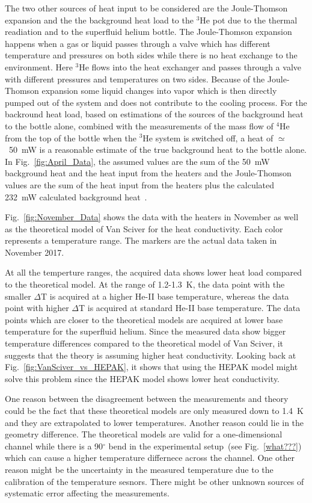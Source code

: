 The two other sources of heat input to be considered are the
Joule-Thomson expansion and the the background heat load to the $^3$He
pot due to the thermal readiation and to the superfluid helium
bottle. The Joule-Thomson expansion happens when a gas or liquid
passes through a valve which has different temperature and pressures
on both sides while there is no heat exchange to the environment. Here
$^3$He flows into the heat exchanger and passes through a valve with
different pressures and temperatures on two sides. Because of the
Joule-Thomson expansion some liquid changes into vapor which is then
directly pumped out of the system and does not contribute to the
cooling process. For the backround heat load, based on estimations of
the sources of the background heat to the bottle alone, combined with
the measurements of the mass flow of $^4$He from the top of the bottle
when the $^3$He system is switched off, a heat of $\simeq$~50~mW is a
reasonable estimate of the true background heat to the bottle
alone. In Fig.~\ref{fig:April_Data}, the assumed values are the sum of
the 50~mW background heat and the heat input from the heaters and the
Joule-Thomson values are the sum of the heat input from the heaters
plus the calculated 232~mW calculated background
heat~\cite{Florian_thesis}.



Fig.~\ref{fig:November_Data} shows the data with the heaters in
November as well as the theoretical model of Van Sciver for the heat
conductivity. Each color represents a temperature range. The markers
are the actual data taken in November 2017.

At all the temperture ranges, the acquired data shows lower heat load
compared to the theoretical model. At the range of 1.2-1.3~K, the data
point with the smaller $\Delta$T is acquired at a higher He-II base
temperature, whereas the data point with higher $\Delta$T is acquired
at standard He-II base temperature. The data points which are closer
to the theoretical models are acquired at lower base temperature for
the superfluid helium. Since the measured data show bigger temperature
differences compared to the theoretical model of Van Sciver, it
suggests that the theory is assuming higher heat conductivity. Looking
back at Fig.~\ref{fig:VanSciver_vs_HEPAK}, it shows that using the
HEPAK model might solve this problem since the HEPAK model shows lower
heat conductivity.

One reason between the disagreement between the measurements and
theory could be the fact that these theoretical models are only
measured down to 1.4~K and they are extrapolated to lower
temperatures. Another reason could lie in the geometry difference. The
theoretical models are valid for a one-dimensional channel while there
is a 90$^\circ$ bend in the experimental setup~(see
Fig.~\ref{what???}) which can cause a higher temperature differnece
across the channel. One other reason might be the uncertainty in the
measured temperature due to the calibration of the temperature
sesnors. There might be other unknown sources of systematic error
affecting the measurements.


